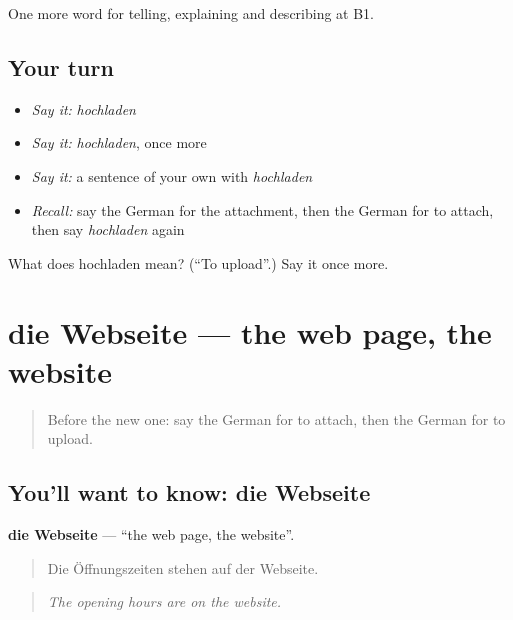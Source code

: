 \begin{grammarlens}[title={What you've built}]
One more word for telling, explaining and describing at B1.
\end{grammarlens}

\subsection*{Your turn}
\begin{itemize}
\raggedright
  \item \emph{Say it:} \emph{hochladen}
  \item \emph{Say it:} \emph{hochladen}, once more
  \item \emph{Say it:} a sentence of your own with \emph{hochladen}
  \item \emph{Recall:} say the German for the attachment, then the German for to attach, then say \emph{hochladen} again
\end{itemize}

\begin{tcolorbox}[breakable,colback=teal!4,colframe=teal!35!black,title={Before you move on}]
What does hochladen mean? (\textquotedblleft{}To upload\textquotedblright{}.) Say it once more.
\end{tcolorbox}
\section[die Webseite]{die Webseite — the web page, the website}

\label{lesson:GE-C394-webseite}



\begin{quote}
Before the new one: say the German for to attach, then the German for to upload.
\end{quote}

\subsection*{You'll want to know: die Webseite}
\textbf{die Webseite} — \textquotedblleft{}the web page, the website\textquotedblright{}.

\begin{quote}
Die Öffnungszeiten stehen auf der Webseite.
\end{quote}

\begin{quote}
\emph{The opening hours are on the website.}
\end{quote}

